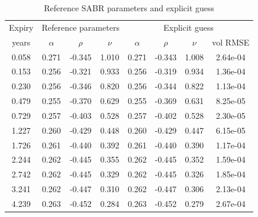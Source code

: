 \documentclass[]{rAMF2e}
\begin{document}

\begin{table}[h]
\begin{center}
\caption{\label{tbl:smart_initialguess_sabr_input}Reference SABR parameters and explicit guess}
\begin{tabular}{c|c c c|c c c c}
\hline
Expiry & \multicolumn{3}{|c|}{Reference parameters} & \multicolumn{4}{|c}{Explicit guess}\\
years & $\alpha$ & $\rho$ & $\nu$ & $\alpha$ & $\rho$ & $\nu$ & vol RMSE \\ 
\hline
0.058&	0.271&	-0.345&	1.010 & 0.271 & -0.343 & 1.008 & 2.64e-04 \\
0.153&	0.256&	-0.321&	0.933 & 0.256 & -0.319 & 0.934 & 1.36e-04\\
0.230&	0.256&	-0.346&	0.820 & 0.256 & -0.344 & 0.822 & 1.13e-04\\
0.479&	0.255&	-0.370&	0.629 & 0.255 & -0.369 & 0.631 & 8.25e-05\\
0.729&	0.257&	-0.403&	0.528 & 0.257 & -0.402 & 0.528 & 2.30e-05\\
1.227&	0.260&	-0.429&	0.448 & 0.260 & -0.429 & 0.447 & 6.15e-05\\
1.726&	0.261&	-0.440&	0.392 & 0.261 & -0.440 & 0.390 & 1.17e-04\\
2.244&	0.262&	-0.445&	0.355 & 0.262 & -0.445 & 0.352 & 1.59e-04\\
2.742&	0.262&	-0.445&	0.329 & 0.262 & -0.445 & 0.326 & 1.85e-04\\
3.241&	0.262&	-0.447&	0.310 & 0.262 & -0.447 & 0.306 & 2.13e-04\\
4.239&	0.263&	-0.452&	0.284 & 0.263 & -0.452 & 0.279 & 2.67e-04\\
\hline
\end{tabular}
\end{center}
\end{table}
\end{document}
